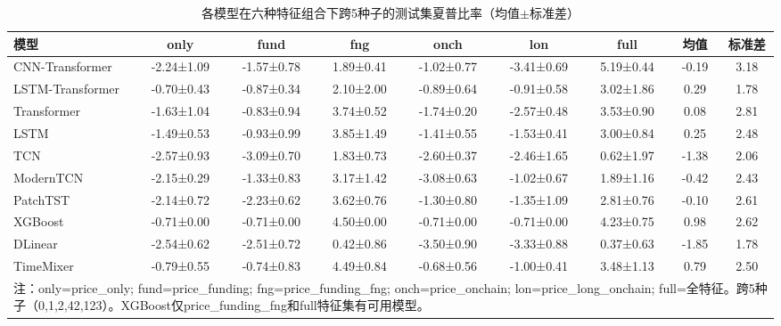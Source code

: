 \begin{table}[ht]
\centering
\caption{各模型在六种特征组合下跨5种子的测试集夏普比率（均值$\pm$标准差）}
\label{tab:feature_ablation_multi_seed}
\footnotesize
\setlength{\tabcolsep}{1.5pt}
\begin{tabular}{lcccccccc}
\toprule
模型 & only & fund & fng & onch & lon & full & 均值 & 标准差 \\
\midrule
CNN-Transformer & -2.24±1.09 & -1.57±0.78 & 1.89±0.41 & -1.02±0.77 & -3.41±0.69 & 5.19±0.44 & -0.19 & 3.18 \\
LSTM-Transformer & -0.70±0.43 & -0.87±0.34 & 2.10±2.00 & -0.89±0.64 & -0.91±0.58 & 3.02±1.86 & 0.29 & 1.78 \\
Transformer & -1.63±1.04 & -0.83±0.94 & 3.74±0.52 & -1.74±0.20 & -2.57±0.48 & 3.53±0.90 & 0.08 & 2.81 \\
LSTM & -1.49±0.53 & -0.93±0.99 & 3.85±1.49 & -1.41±0.55 & -1.53±0.41 & 3.00±0.84 & 0.25 & 2.48 \\
TCN & -2.57±0.93 & -3.09±0.70 & 1.83±0.73 & -2.60±0.37 & -2.46±1.65 & 0.62±1.97 & -1.38 & 2.06 \\
ModernTCN & -2.15±0.29 & -1.33±0.83 & 3.17±1.42 & -3.08±0.63 & -1.02±0.67 & 1.89±1.16 & -0.42 & 2.43 \\
PatchTST & -2.14±0.72 & -2.23±0.62 & 3.62±0.76 & -1.30±0.80 & -1.35±1.09 & 2.81±0.76 & -0.10 & 2.61 \\
XGBoost & -0.71±0.00 & -0.71±0.00 & 4.50±0.00 & -0.71±0.00 & -0.71±0.00 & 4.23±0.75 & 0.98 & 2.62 \\
DLinear & -2.54±0.62 & -2.51±0.72 & 0.42±0.86 & -3.50±0.90 & -3.33±0.88 & 0.37±0.63 & -1.85 & 1.78 \\
TimeMixer & -0.79±0.55 & -0.74±0.83 & 4.49±0.84 & -0.68±0.56 & -1.00±0.41 & 3.48±1.13 & 0.79 & 2.50 \\
\bottomrule
\multicolumn{9}{p{\textwidth}}{\footnotesize 
注：only=price\_only; fund=price\_funding; fng=price\_funding\_fng; onch=price\_onchain; lon=price\_long\_onchain; full=全特征。跨5种子（0,1,2,42,123）。XGBoost仅price\_funding\_fng和full特征集有可用模型。}
\end{tabular}
\end{table}